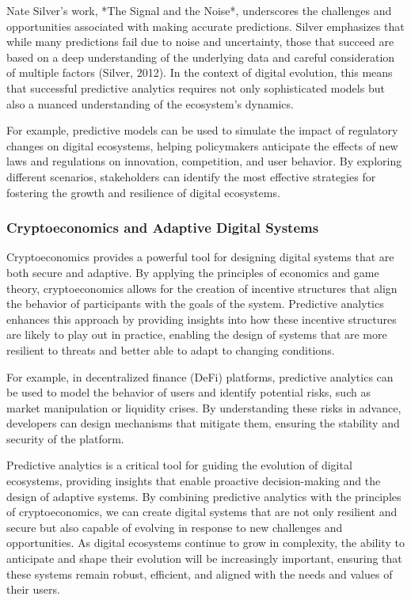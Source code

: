 \documentclass[12pt,twoside]{article}
\begin{document}
Nate Silver's work, *The Signal and the Noise*, underscores the challenges and opportunities associated with making accurate predictions. Silver emphasizes that while many predictions fail due to noise and uncertainty, those that succeed are based on a deep understanding of the underlying data and careful consideration of multiple factors (Silver, 2012). In the context of digital evolution, this means that successful predictive analytics requires not only sophisticated models but also a nuanced understanding of the ecosystem's dynamics.

For example, predictive models can be used to simulate the impact of regulatory changes on digital ecosystems, helping policymakers anticipate the effects of new laws and regulations on innovation, competition, and user behavior. By exploring different scenarios, stakeholders can identify the most effective strategies for fostering the growth and resilience of digital ecosystems.


\subsubsection{Cryptoeconomics and Adaptive Digital Systems}

Cryptoeconomics provides a powerful tool for designing digital systems that are both secure and adaptive. By applying the principles of economics and game theory, cryptoeconomics allows for the creation of incentive structures that align the behavior of participants with the goals of the system. Predictive analytics enhances this approach by providing insights into how these incentive structures are likely to play out in practice, enabling the design of systems that are more resilient to threats and better able to adapt to changing conditions.

For example, in decentralized finance (DeFi) platforms, predictive analytics can be used to model the behavior of users and identify potential risks, such as market manipulation or liquidity crises. By understanding these risks in advance, developers can design mechanisms that mitigate them, ensuring the stability and security of the platform.

Predictive analytics is a critical tool for guiding the evolution of digital ecosystems, providing insights that enable proactive decision-making and the design of adaptive systems. By combining predictive analytics with the principles of cryptoeconomics, we can create digital systems that are not only resilient and secure but also capable of evolving in response to new challenges and opportunities. As digital ecosystems continue to grow in complexity, the ability to anticipate and shape their evolution will be increasingly important, ensuring that these systems remain robust, efficient, and aligned with the needs and values of their users.
\end{document}
